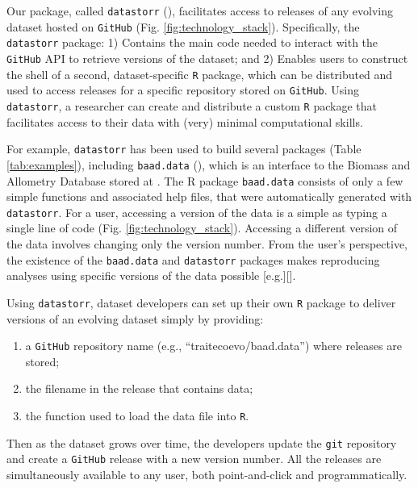 \documentclass[a4paper,num-refs]{assets/oup-contemporary}
\begin{document}
Our package, called \texttt{datastorr} (), facilitates access to releases of any evolving dataset hosted on \texttt{GitHub} (Fig. \ref{fig:technology_stack}). Specifically, the \texttt{datastorr} package: 1) Contains the main code needed to interact with the \texttt{GitHub} API to retrieve versions of the dataset; and 2) Enables users to construct the shell of a second, dataset-specific \texttt{R} package, which can be distributed and used to access releases for a specific repository stored on \texttt{GitHub}. Using \texttt{datastorr}, a researcher can create and distribute a custom \texttt{R} package that facilitates access to their data with (very) minimal computational skills.

For example, \texttt{datastorr} has been used to build several packages (Table \ref{tab:examples}), including \texttt{baad.data} (), which is an interface to the Biomass and Allometry Database \cite{Falster-2015} stored at . The R package \texttt{baad.data} consists of only a few simple functions and associated help files, that were automatically generated with \texttt{datastorr}. For a user, accessing a version of the data is a simple as typing a single line of code (Fig. \ref{fig:technology_stack}). Accessing a different version of the data involves changing only the version number. From the user's perspective, the existence of the \texttt{baad.data} and \texttt{datastorr} packages makes reproducing analyses using specific versions of the data possible [e.g.][]\cite{Duursma-2016,Falster-2018}.


Using \texttt{datastorr}, dataset developers can set up their own \texttt{R} package to deliver versions of an evolving dataset simply by providing:
\begin{enumerate}
  \item a \texttt{GitHub} repository name (e.g., ``traitecoevo/baad.data'') where releases are stored;
  \item the filename in the release that contains data;
  \item the function used to load the data file into \texttt{R}.
\end{enumerate}

Then as the dataset grows over time, the developers update the \texttt{git} repository and create a \texttt{GitHub} release with a new version number. All the releases are simultaneously available to any user, both point-and-click and programmatically.
\end{document}
